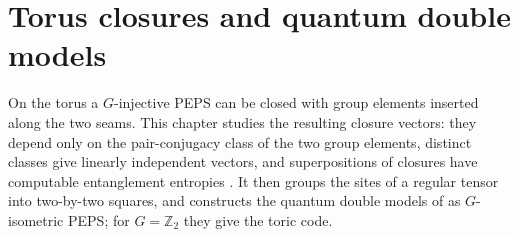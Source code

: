 
\chapter{Torus closures and quantum double models}%
\label{ch:peps_torus_closures}

On the torus a $G$-injective PEPS can be closed with group elements
inserted along the two seams. This chapter studies the resulting closure
vectors: they depend only on the pair-conjugacy class of the two group
elements, distinct classes give linearly independent vectors, and
superpositions of closures have computable entanglement entropies
\cite{Schuch2010PEPS}. It then groups the sites of a regular tensor into
two-by-two squares, and constructs the quantum double models of
\cite{Kitaev2003FaultTolerant} as $G$-isometric PEPS; for $G=\mathbb{Z}_2$
they give the toric code.

















